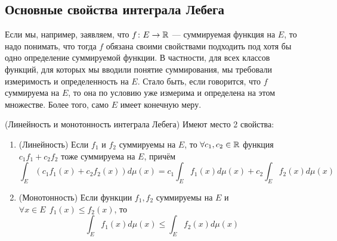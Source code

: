 \subsection{Основные свойства интеграла Лебега}

\begin{anote}
	Если мы, например, заявляем, что $f \colon E \to \mathbb{R}$ --- суммируемая функция на $E$, то надо понимать, что тогда $f$ обязана своими свойствами подходить под хотя бы одно определение суммируемой функции. В частности, для всех классов функций, для которых мы вводили понятие суммирования, мы требовали измеримость и определенность на $E$. Стало быть, если говорится, что $f$ суммируема на $E$, то она по условию уже измерима и определена на этом множестве. Более того, само $E$ имеет конечную меру.
\end{anote}

\begin{theorem} (Линейность и монотонность интеграла Лебега)
	Имеют место 2 свойства:
	\begin{enumerate}
		\item (Линейность) Если $f_1$ и $f_2$ суммируемы на $E$, то $\forall c_1, c_2 \in \mathbb{R}$ функция $c_1 f_1 + c_2 f_2$ тоже суммируема на $E$, причём
		\[
			\int_E (c_1f_1(x) + c_2f_2(x))d\mu(x) = c_1\int_E f_1(x)d\mu(x) + c_2\int_E f_2(x)d\mu(x)
		\]
		
		\item (Монотонность) Если функции $f_1, f_2$ суммируемы на $E$ и $\forall x \in E\ \ f_1(x) \le f_2(x)$, то
		\[
			\int_E f_1(x)d\mu(x) \le \int_E f_2(x)d\mu(x)
		\]
	\end{enumerate}
\end{theorem}

